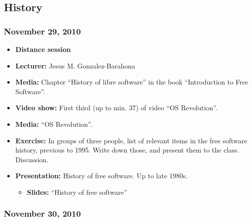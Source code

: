 \documentclass[a4paper]{article}
\begin{document}
\subsection{History}


\subsubsection{November 29, 2010}

\begin{itemize}
\item \textbf{Distance session}
\item \textbf{Lecturer:} Jesus M. Gonzalez-Barahona
\item \textbf{Media:} Chapter ``History of libre software'' in the book ``Introduction to Free Software''.

\item \textbf{Video show:} First third (up to min. 37) of video ``OS Revolution''.
\item \textbf{Media:} ``OS Revolution''.

\item \textbf{Exercise:} In groups of three people, list of relevant items in the free software history, previous to 1995. Write down those, and present them to the class. Discussion.
\item \textbf{Presentation:} History of free software. Up to late 1980s.
  \begin{itemize}
  \item \textbf{Slides:} ``History of free software''
  \end{itemize}
\end{itemize}

\subsubsection{November 30, 2010}
\end{document}
